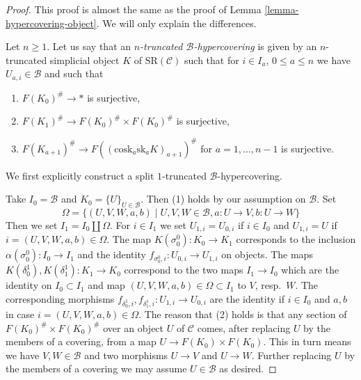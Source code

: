 \documentclass[10pt,a4paper]{article}
\theoremstyle{plain}
\theoremstyle{definition}
\theoremstyle{remark}
\numberwithin{equation}{subsection}
\begin{document}
\begin{proof}
This proof is almost the same as the proof of
Lemma \ref{lemma-hypercovering-object}. We will
only explain the differences.

\medskip\noindent
Let $n \geq 1$. Let us say that an
{\it $n$-truncated $\mathcal{B}$-hypercovering}
is given by an $n$-truncated simplicial
object $K$ of $\text{SR}(\mathcal{C})$
such that for $i \in I_a$, $0 \leq a \leq n$
we have $U_{a, i} \in \mathcal{B}$ and such that
\begin{enumerate}
\item $F(K_0)^\# \to *$ is surjective,
\item $F(K_1)^\# \to F(K_0)^\# \times F(K_0)^\#$ is surjective,
\item $F(K_{a + 1})^\# \to F((\text{cosk}_a \text{sk}_a K)_{a + 1})^\#$
for $a = 1, \ldots, n - 1$ is surjective.
\end{enumerate}
We first explicitly construct a split $1$-truncated $\mathcal{B}$-hypercovering.

\medskip\noindent
Take $I_0 = \mathcal{B}$ and $K_0 = \{U\}_{U \in \mathcal{B}}$.
Then (1) holds by our assumption on $\mathcal{B}$. Set
$$
\Omega =
\{(U, V, W, a, b) \mid U, V, W \in \mathcal{B}, a : U \to V, b : U \to W\}
$$
Then we set $I_1 = I_0 \amalg \Omega$. For $i \in I_1$ we set
$U_{1, i} = U_{0, i}$ if $i \in I_0$ and $U_{1, i} = U$
if $i = (U, V, W, a, b) \in \Omega$. The map
$K(\sigma^0_0) : K_0 \to K_1$ corresponds to the
inclusion $\alpha(\sigma^0_0) : I_0 \to I_1$
and the identity $f_{\sigma^0_0, i} : U_{0, i} \to U_{1, i}$
on objects. The maps $K(\delta^1_0), K(\delta^1_1) : K_1 \to K_0$
correspond to the two maps $I_1 \to I_0$ which are the
identity on $I_0 \subset I_1$ and map $(U, V, W, a, b) \in \Omega \subset I_1$
to $V$, resp.\ $W$. The corresponding morphisms
$f_{\delta^1_0, i}, f_{\delta^1_1, i} : U_{1, i} \to U_{0, i}$ are
the identity if $i \in I_0$ and $a, b$ in case $i = (U, V, W, a, b) \in \Omega$.
The reason that (2) holds is that any section of
$F(K_0)^\# \times F(K_0)^\#$ over an object $U$ of $\mathcal{C}$
comes, after replacing $U$ by the members of a covering,
from a map $U \to F(K_0) \times F(K_0)$.
This in turn means we have $V, W \in \mathcal{B}$
and two morphisms $U \to V$ and $U \to W$. Further replacing
$U$ by the members of a covering we may assume $U \in \mathcal{B}$
as desired.


\end{proof}
\end{document}
